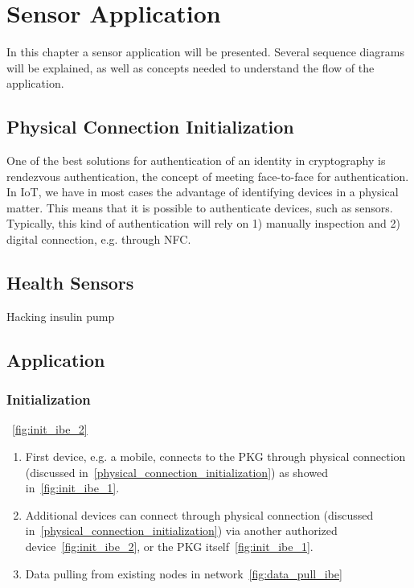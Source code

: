 \chapter{Sensor Application}\label{sensor-application}
In this chapter a sensor application will be presented. 
Several sequence diagrams will be explained, as well as concepts needed to understand the flow of the application. 

\section{Physical Connection Initialization}\label{physical_connection_initialization}
One of the best solutions for authentication of an identity in cryptography is rendezvous authentication, the concept of meeting face-to-face for authentication. 
In \gls{IoT}, we have in most cases the advantage of identifying devices in a physical matter. 
This means that it is possible to authenticate devices, such as sensors. 
Typically, this kind of authentication will rely on 1) manually inspection and 2) digital connection, e.g. through \gls{NFC}.

\section{Health Sensors}
Hacking insulin pump~\cite{radcliffe2011hacking}

\section{Application}


\subsection{Initialization}
~\autoref{fig:init_ibe_2}

\begin{enumerate}
  \item First device, e.g. a mobile, connects to the \gls{PKG} through physical connection (discussed in~\autoref{physical_connection_initialization}) as showed in~\autoref{fig:init_ibe_1}.
  \item Additional devices can connect through physical connection (discussed in~\autoref{physical_connection_initialization}) via another authorized device~\autoref{fig:init_ibe_2}, or the \gls{PKG} itself~\autoref{fig:init_ibe_1}. 
  \item Data pulling from existing nodes in network~\autoref{fig:data_pull_ibe}
\end{enumerate}

